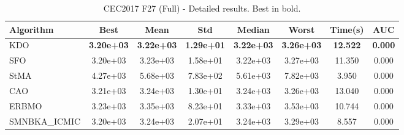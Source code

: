 \begin{table}[H]
\centering\small
\caption{CEC2017 F27 (Full) - Detailed results. Best in bold.}
\label{tab:cec2017_F27}
\begin{tabular}{lccccccc}
\toprule
\textbf{Algorithm} & \textbf{Best} & \textbf{Mean} & \textbf{Std} & \textbf{Median} & \textbf{Worst} & \textbf{Time(s)} & \textbf{AUC} \\
\midrule
KDO & \textbf{3.20e+03} & \textbf{3.22e+03} & \textbf{1.29e+01} & \textbf{3.22e+03} & \textbf{3.26e+03} & \textbf{12.522} & \textbf{0.000} \\
SFO & 3.20e+03 & 3.23e+03 & 1.58e+01 & 3.22e+03 & 3.27e+03 & 11.350 & 0.000 \\
StMA & 4.27e+03 & 5.68e+03 & 7.83e+02 & 5.61e+03 & 7.82e+03 & 3.950 & 0.000 \\
CAO & 3.21e+03 & 3.24e+03 & 1.30e+01 & 3.24e+03 & 3.26e+03 & 13.040 & 0.000 \\
ERBMO & 3.23e+03 & 3.35e+03 & 8.23e+01 & 3.33e+03 & 3.53e+03 & 10.744 & 0.000 \\
SMNBKA_ICMIC & 3.20e+03 & 3.24e+03 & 2.07e+01 & 3.24e+03 & 3.29e+03 & 8.557 & 0.000 \\
\bottomrule
\end{tabular}
\end{table}
